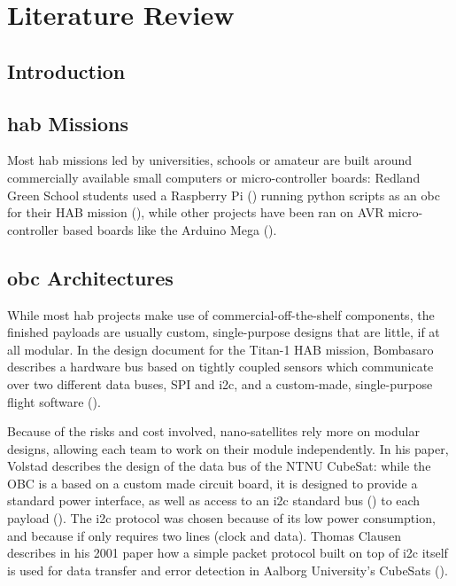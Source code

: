 \chapter{Literature Review}
\label{ch:literature-review}

\section{Introduction}

\section{\acrlong{hab} Missions}

Most \acrshort{hab} missions led by universities, schools or amateur are built 
around commercially available small computers or micro-controller boards:
Redland Green School students used a Raspberry Pi (\cite{rpi2014}) running
python scripts as an \acrfull{obc} for their HAB mission
(\cite{Hinschelwood2015}), while other projects have been ran on AVR
micro-controller based boards like the Arduino Mega
(\cite{AtmelCorporation2015}).

\section{\acrlong{obc} Architectures}

While most \acrshort{hab} projects make use of commercial-off-the-shelf
components, the finished payloads are usually custom, single-purpose designs
that are little, if at all modular. In the design document for the Titan-1 HAB
mission, Bombasaro describes a hardware bus based on tightly coupled sensors
which communicate over two different data buses, SPI and \acrshort{i2c}, and a
custom-made, single-purpose flight software (\cite{Bombasaro2015}).

Because of the risks and cost involved, nano-satellites rely more on modular
designs, allowing each team to work on their module independently. In his paper,
Volstad describes the design of the data bus of the NTNU CubeSat: while the OBC
is a based on a custom made circuit board, it is designed to provide a standard
power interface, as well as access to an \acrshort{i2c} standard bus
(\cite{NXPSemiconductors2014}) to each payload (\cite{Volstad2011}). The
\acrshort{i2c} protocol was chosen because of its low power consumption, and
because if only requires two lines (clock and data). Thomas Clausen describes
in his 2001 paper how a simple packet protocol built on top of \acrshort{i2c}
itself is used for data transfer and error detection in Aalborg University's
CubeSats (\cite{Clausen2001}).

